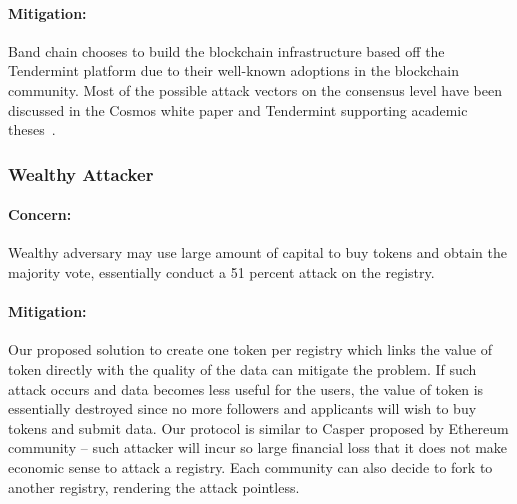 \documentclass[letterpaper,11pt]{article}
\begin{document}
\paragraph{Mitigation:}
Band chain chooses to build the blockchain infrastructure based off the Tendermint platform due to their well-known adoptions in the blockchain community. Most of the possible attack vectors on the consensus level have been discussed in the Cosmos white paper and Tendermint supporting academic theses~\cite{cosmoswhitepaper,buchman2016tendermint,kwon2014tendermint}.

\subsubsection{Wealthy Attacker}
\paragraph{Concern:} Wealthy adversary may use large amount of capital to buy tokens and obtain the majority vote, essentially conduct a 51 percent attack on the registry.  

\paragraph{Mitigation:} Our proposed solution to create one token per registry which links the value of token directly with the quality of the data can mitigate the problem. If such attack occurs and data becomes less useful for the users, the value of token is essentially destroyed since no more followers and applicants will wish to buy tokens and submit data. Our protocol is similar to Casper proposed by Ethereum community -- such attacker will incur so large financial loss that it does not make economic sense to attack a registry. Each community can also decide to fork to another registry, rendering the attack pointless. 




\end{document}
